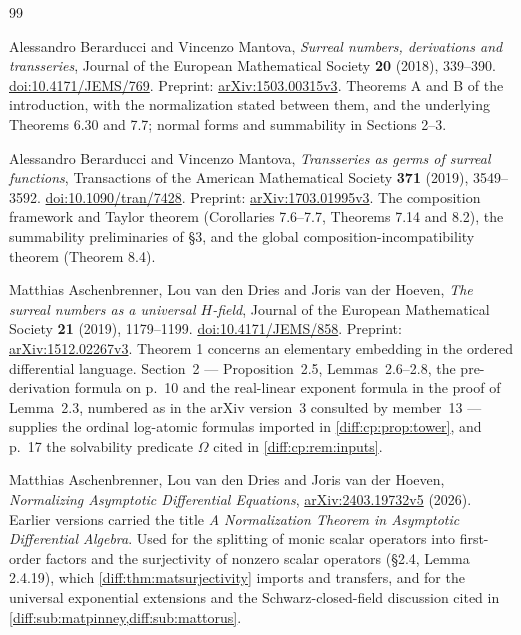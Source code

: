 \documentclass[11pt,letterpaper]{article}
\numberwithin{equation}{section}
\theoremstyle{definition}
\theoremstyle{remark}
\begin{document}
\clearpage
{}
{}
\begin{thebibliography}{99}\small\raggedright

Alessandro Berarducci and Vincenzo Mantova,
\emph{Surreal numbers, derivations and transseries},
Journal of the European Mathematical Society \textbf{20} (2018), 339--390.
\href{https://doi.org/10.4171/JEMS/769}{doi:10.4171/JEMS/769}.
Preprint: \href{https://arxiv.org/abs/1503.00315v3}{arXiv:1503.00315v3}.
Theorems A and B of the introduction, with the normalization stated between
them, and the underlying Theorems 6.30 and 7.7; normal forms and summability
in Sections 2--3.

Alessandro Berarducci and Vincenzo Mantova,
\emph{Transseries as germs of surreal functions},
Transactions of the American Mathematical Society \textbf{371} (2019),
3549--3592.
\href{https://doi.org/10.1090/tran/7428}{doi:10.1090/tran/7428}.
Preprint: \href{https://arxiv.org/abs/1703.01995v3}{arXiv:1703.01995v3}.
The composition framework and Taylor theorem (Corollaries 7.6--7.7, Theorems
7.14 and 8.2), the summability preliminaries of \S3, and the global
composition-incompatibility theorem (Theorem 8.4).

Matthias Aschenbrenner, Lou van den Dries and Joris van der Hoeven,
\emph{The surreal numbers as a universal $H$-field},
Journal of the European Mathematical Society \textbf{21} (2019), 1179--1199.
\href{https://doi.org/10.4171/JEMS/858}{doi:10.4171/JEMS/858}.
Preprint: \href{https://arxiv.org/abs/1512.02267v3}{arXiv:1512.02267v3}.
Theorem 1 concerns an elementary embedding in the ordered differential
language. Section~2 --- Proposition~2.5, Lemmas~2.6--2.8, the pre-derivation
formula on p.~10 and the real-linear exponent formula in the proof of
Lemma~2.3, numbered as in the arXiv version~3 consulted by member~13 --- supplies
the ordinal log-atomic formulas imported in \cref{diff:cp:prop:tower}, and
p.~17 the solvability predicate $\Omega$ cited in \cref{diff:cp:rem:inputs}.

Matthias Aschenbrenner, Lou van den Dries and Joris van der Hoeven,
\emph{Normalizing Asymptotic Differential Equations},
\href{https://arxiv.org/abs/2403.19732v5}{arXiv:2403.19732v5} (2026).
Earlier versions carried the title \emph{A Normalization Theorem in Asymptotic
Differential Algebra}. Used for the splitting of monic scalar operators into
first-order factors and the surjectivity of nonzero scalar operators
(\S2.4, Lemma 2.4.19), which \cref{diff:thm:matsurjectivity} imports and
transfers, and for the universal exponential extensions and the
Schwarz-closed-field discussion cited in
\cref{diff:sub:matpinney,diff:sub:mattorus}.


\end{thebibliography}
\end{document}
